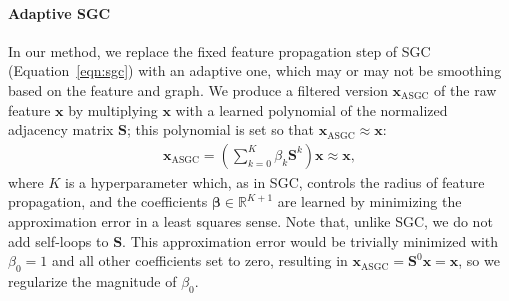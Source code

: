\documentclass{article}
\begin{document}
\paragraph{Adaptive SGC} In our method, we replace the fixed feature propagation step of SGC (Equation~\ref{eqn:sgc}) with an adaptive one, which may or may not be smoothing based on the feature and graph. We produce a filtered version $\bm{x}_\text{ASGC}$ of the raw feature $\bm{x}$ by multiplying $\bm{x}$ with a learned polynomial of the normalized adjacency matrix $\bm{S}$; this polynomial is set so that $\bm{x}_\text{ASGC} \approx \bm{x}$:
%
\begin{align} \label{eqn:poly_filter}
    \bm{x}_\text{ASGC} = \left(\sum\nolimits_{k=0}^K \beta_k \bm{S}^k \right) \bm{x} \approx \bm{x},
\end{align}
%
where $K$ is a hyperparameter which, as in SGC, controls the radius of feature propagation, and the coefficients $\bm{\beta} \in \mathbb{R}^{K+1}$ are learned by minimizing the approximation error in a least squares sense. Note that, unlike SGC, we do not add self-loops to $\bm{S}$. This approximation error would be trivially minimized with $\beta_0 = 1$ and all other coefficients set to zero, resulting in $\bm{x}_\text{ASGC} = \bm{S}^0 \bm{x} = \bm{x}$, so we regularize the magnitude of $\beta_0$.
\end{document}
